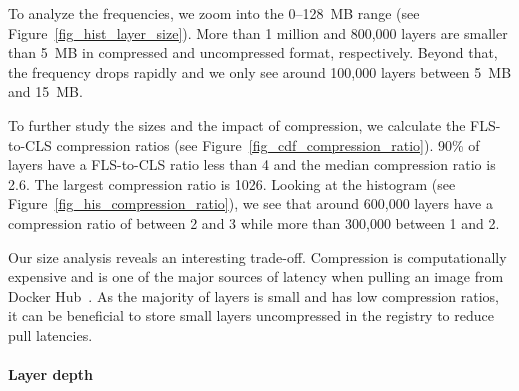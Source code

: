 To analyze the frequencies, we zoom into the 0--128~MB range
(see Figure~\ref{fig_hist_layer_size}).
%
More than 1 million and 800,000 layers are smaller than 5~MB
in compressed and uncompressed format, respectively. Beyond that,
the frequency drops rapidly and we only see around 100,000 layers
between 5~MB and 15~MB.

%


To further study the sizes and the impact of compression, we calculate
the FLS-to-CLS compression ratios (see Figure~\ref{fig_cdf_compression_ratio}).
%
%
90\% of layers have a  FLS-to-CLS ratio less than 4 and the median
compression ratio is 2.6. The largest compression ratio is 1026.
%
%
%
%
Looking at the histogram (see Figure~\ref{fig_his_compression_ratio}), we see
that around 600,000 layers have a compression ratio of between 2 and 3 while more than
300,000 between 1 and 2.
%

Our size analysis reveals an interesting trade-off. Compression is computationally
expensive and is one of the major sources of latency when pulling an image from Docker Hub~\cite{slacker}.
As the majority of layers is small and has low compression ratios, it can
be beneficial to store small layers uncompressed in the registry to reduce pull latencies.

\paragraph{Layer depth}


